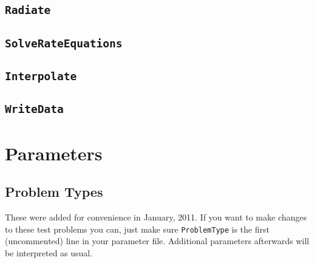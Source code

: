 \documentclass[letterpaper,titlepage,12pt]{article}
\numberwithin{equation}{section}
\begin{document}
\subsection{\texttt{Radiate}}
\subsection{\texttt{SolveRateEquations}}
\subsection{\texttt{Interpolate}}
\subsection{\texttt{WriteData}}

\section{Parameters}

\subsection{Problem Types}
These were added for convenience in January, 2011.  If you want to make changes to these test problems you can, just make sure \texttt{ProblemType} is the first (uncommented) line in your parameter file.  Additional parameters afterwards will be interpreted as usual.
\end{document}
